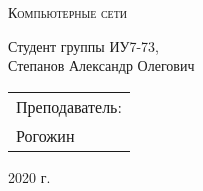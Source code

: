 \begin{center}
    \LARGE
    \textsc{Компьютерные сети}
\end{center}

\vspace{3cm}

\begin{center}
    \large

    Студент группы ИУ7-73,\\
    Степанов Александр Олегович
    \vfill
\end{center}

\begin{flushright}
    \large
    \begin{tabular}{l}
        Преподаватель: \\
        Рогожин \\
    \end{tabular}
\end{flushright}

\begin{center}
    2020 г.
\end{center}
